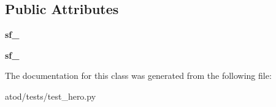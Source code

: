 \subsection*{Public Attributes}
\begin{DoxyCompactItemize}
\item 
{\bfseries sf\+\_}\hypertarget{classatod_1_1tests_1_1test__hero_1_1_test_hero_a13aef92222c9de04db869b3ae3a6f37b}{}\label{classatod_1_1tests_1_1test__hero_1_1_test_hero_a13aef92222c9de04db869b3ae3a6f37b}

\item 
{\bfseries sf\+\_}\hypertarget{classatod_1_1tests_1_1test__hero_1_1_test_hero_aebd81b2d29d3c978e0acee2c8e794ab5}{}\label{classatod_1_1tests_1_1test__hero_1_1_test_hero_aebd81b2d29d3c978e0acee2c8e794ab5}

\end{DoxyCompactItemize}


The documentation for this class was generated from the following file\+:\begin{DoxyCompactItemize}
\item 
atod/tests/test\+\_\+hero.\+py\end{DoxyCompactItemize}
